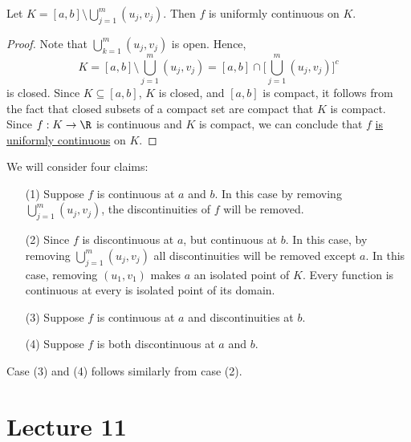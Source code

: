 \begin{lemma}[Claim 2]
    Let \( K = [a,b] \setminus  \bigcup_{ j=1 }^{ m } ({u}_{j}, {v}_{j})  \). Then \( f \) is uniformly continuous on \( K  \).
\end{lemma}
\begin{proof}
Note that \( \bigcup_{ k=1  }^{ m } ({u}_{j}, {v}_{j})   \) is open. Hence, 
\[  K = [a,b] \setminus  \bigcup_{ j=1  }^{ m }  ({u}_{j}, {v}_{j}) = [a,b] \cap \Big[ \bigcup_{ j=1  }^{ m }  ({u}_{j}, {v}_{j}) \Big]^{c} \]
is closed. Since \( K \subseteq  [a,b] \), \( K  \) is closed, and \( [a,b]  \) is compact, it follows from the fact that closed subsets of a compact set are compact that \( K  \) is compact. Since \( f: K \to \R  \) is continuous and \( K  \) is compact, we can conclude that \( f  \) {\hyperref[is uniformly continuous]{is uniformly continuous}} on \( K  \).
\end{proof}

\begin{remark}\label{is uniformly continuous}
   We will consider four claims:
   \begin{enumerate}
       \item[(1)] Suppose \( f  \) is continuous at \( a \) and \( b  \). In this case by removing \( \bigcup_{ j=1  }^{ m }  ({u}_{j}, {v}_{j})  \), the discontinuities of \( f  \) will be removed.
        \item[(2)] Since \( f  \) is discontinuous at \( a \), but continuous at \( b  \). In this case, by removing \( \bigcup_{ j=1 }^{ m } ({u}_{j},{v}_{j}) \) all discontinuities will be removed except \( a \). In this case, removing \( ({u}_{1}, {v}_{1}) \) makes \( a \) an isolated point of \( K  \). Every function is continuous at every is isolated point of its domain.
        \item[(3)] Suppose \( f \) is continuous at \( a \) and discontinuities at \( b \).
        \item[(4)] Suppose \( f \) is both discontinuous at \( a \) and \( b \).
   \end{enumerate}
   Case (3) and (4) follows similarly from case (2).
\end{remark}




\section{Lecture 11}


